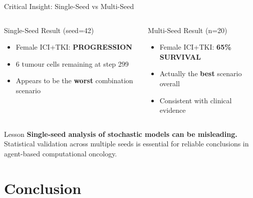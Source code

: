 \documentclass[aspectratio=169,10pt]{beamer}
\begin{document}
\begin{frame}{Critical Insight: Single-Seed vs Multi-Seed}
  \begin{columns}[T]
    \begin{alertblock}{Single-Seed Result (seed=42)}
      \begin{itemize}
        \item Female ICI+TKI: \textbf{PROGRESSION}
        \item 6 tumour cells remaining at step 299
        \item Appears to be the \textbf{worst} combination scenario
      \end{itemize}
    \end{alertblock}

    \begin{exampleblock}{Multi-Seed Result (n=20)}
      \begin{itemize}
        \item Female ICI+TKI: \textbf{65\% SURVIVAL}
        \item Actually the \textbf{best} scenario overall
        \item Consistent with clinical evidence
      \end{itemize}
    \end{exampleblock}
  \end{columns}

  \vspace{1em}
  \centering
  \begin{block}{Lesson}
    \large
    \textbf{Single-seed analysis of stochastic models can be misleading.}\\[0.3em]
    \normalsize
    Statistical validation across multiple seeds is essential for reliable conclusions in agent-based computational oncology.
  \end{block}
\end{frame}

\section{Conclusion}
\end{document}
